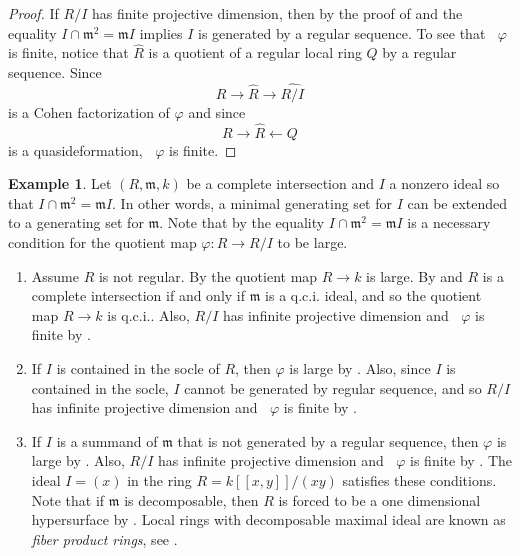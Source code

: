 \documentclass{amsart}
\theoremstyle{definition}
\newtheorem{example}[theorem]{Example}
\DeclareMathOperator{\uppercidim}{CI^{*}dim}
\newcommand{\m}{\mathfrak{m}}
\begin{document}
\begin{proof}
If $R/I$ has finite projective dimension, then by the proof of \cite[Example 2.4.1]{Gheibi/Takahashi:2021} and the equality $I\cap \m^{2}=\m I$ implies $I$ is generated by a regular sequence. To see that $\uppercidim{\varphi}$ is finite, notice that $\widehat{R}$ is a quotient of a regular local ring $Q$ by a regular sequence. Since 
\[R\rightarrow \widehat{R}\rightarrow \widehat{R/I}\]
is a Cohen factorization of $\varphi$ and since 
\[R\rightarrow \widehat{R}\leftarrow Q\]
is a quasideformation, $\uppercidim{\varphi}$ is finite.
\end{proof}


\begin{example} \label{E_NontrivialExample} Let $(R,\m,k)$ be a complete intersection and $I$ a nonzero ideal so that $I\cap \m^{2}=\m I$. In other words, a minimal generating set for $I$ can be extended to a generating set for $\m$. Note that by \cite[2.3]{Gheibi/Takahashi:2021} the equality $I\cap \m^{2}=\m I$ is a necessary condition for the quotient map $\varphi\colon R\rightarrow R/I$ to be large. 
\begin{enumerate}
\item Assume $R$ is not regular. By \cite[Example 2.4.3]{Gheibi/Takahashi:2021} the quotient map $R\rightarrow k$ is large. By \cite[Theorem 2.7]{Assmus:1959} and \cite[Theorem 2.3.11]{Bruns/Herzog:1998} $R$ is a complete intersection if and only if $\mathfrak{m}$ is a q.c.i. ideal, and so the quotient map $R\rightarrow k$ is q.c.i.. Also, $R/I$ has infinite projective dimension and $\uppercidim{\varphi}$ is finite by .
\item If $I$ is contained in the socle of $R$, then $\varphi$ is large by \cite[Example 2.4.2]{Gheibi/Takahashi:2021}. Also, since $I$ is contained in the socle, $I$ cannot be generated by regular sequence, and so $R/I$ has infinite projective dimension and $\uppercidim{\varphi}$ is finite by .  
\item If $I$ is a summand of $\m$ that is not generated by a regular sequence, then $\varphi$ is large by \cite[Example 2.4.6]{Gheibi/Takahashi:2021}. Also, $R/I$ has infinite projective dimension and $\uppercidim{\varphi}$ is finite by . The ideal $I=(x)$ in the ring $R=k[[x,y]]/(xy)$ satisfies these conditions. Note that if $\m$ is decomposable, then $R$ is forced to be a one dimensional hypersurface by \cite[Corollary 2.7]{Nasseh/SatherWagstaff/Takahashi/VandeBogert:2019}. Local rings with decomposable maximal ideal are known as \textit{fiber product rings}, see \cite[Fact 2.1]{Nasseh/SatherWagstaff/Takahashi/VandeBogert:2019}.

\end{enumerate}
\end{example}
\end{document}
